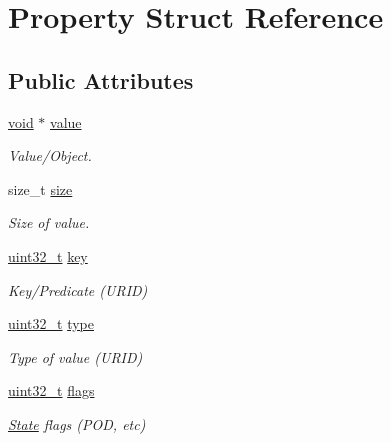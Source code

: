 \hypertarget{struct_property}{}\section{Property Struct Reference}
\label{struct_property}
\subsection*{Public Attributes}
\begin{DoxyCompactItemize}
\item 
\hyperlink{sound_8c_ae35f5844602719cf66324f4de2a658b3}{void} $\ast$ \hyperlink{struct_property_a4a926eea767e932bfb1da724b43f1463}{value}
\begin{DoxyCompactList}\small\item\em Value/\+Object. \end{DoxyCompactList}\item 
size\+\_\+t \hyperlink{struct_property_a4975c4f772ea576ce0fdd12b65036632}{size}
\begin{DoxyCompactList}\small\item\em Size of value. \end{DoxyCompactList}\item 
\hyperlink{lib-src_2ffmpeg_2win32_2stdint_8h_a6eb1e68cc391dd753bc8ce896dbb8315}{uint32\+\_\+t} \hyperlink{struct_property_a71e1b4425e7276a3861ff902b066df8d}{key}
\begin{DoxyCompactList}\small\item\em Key/\+Predicate (U\+R\+ID) \end{DoxyCompactList}\item 
\hyperlink{lib-src_2ffmpeg_2win32_2stdint_8h_a6eb1e68cc391dd753bc8ce896dbb8315}{uint32\+\_\+t} \hyperlink{struct_property_adb514bcdfd564833e3a30c80f54f3de9}{type}
\begin{DoxyCompactList}\small\item\em Type of value (U\+R\+ID) \end{DoxyCompactList}\item 
\hyperlink{lib-src_2ffmpeg_2win32_2stdint_8h_a6eb1e68cc391dd753bc8ce896dbb8315}{uint32\+\_\+t} \hyperlink{struct_property_ad71ec64f7699f9b7801e54f57ad2aa96}{flags}
\begin{DoxyCompactList}\small\item\em \hyperlink{struct_state}{State} flags (P\+OD, etc) \end{DoxyCompactList}\end{DoxyCompactItemize}


